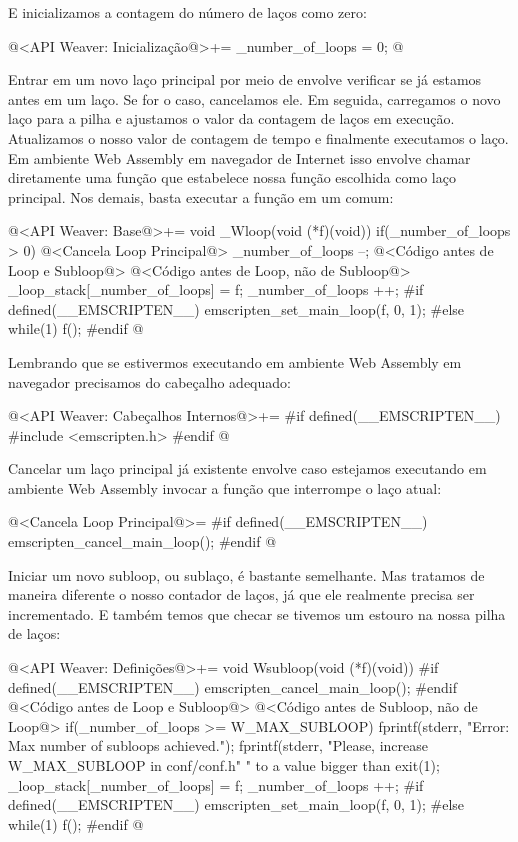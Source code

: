 E inicializamos a contagem do número de laços como zero:

\iniciocodigo
@<API Weaver: Inicialização@>+=
_number_of_loops = 0;
@
\fimcodigo

Entrar em um novo laço principal por meio de 
envolve verificar se já estamos antes em um laço. Se for o caso,
cancelamos ele. Em seguida, carregamos o novo laço para a pilha e
ajustamos o valor da contagem de laços em execução. Atualizamos o
nosso valor de contagem de tempo e finalmente executamos o laço. Em
ambiente Web Assembly em navegador de Internet isso envolve chamar
diretamente uma função que estabelece nossa função escolhida como laço
principal. Nos demais, basta executar a função em
um  comum:

\iniciocodigo
@<API Weaver: Base@>+=
void _Wloop(void (*f)(void)){
  if(_number_of_loops > 0){
    @<Cancela Loop Principal@>
    _number_of_loops --;
  }
  @<Código antes de Loop e Subloop@>
  @<Código antes de Loop, não de Subloop@>
  _loop_stack[_number_of_loops] = f;
  _number_of_loops ++;
#if defined(__EMSCRIPTEN__)
  emscripten_set_main_loop(f, 0, 1);
#else
  while(1)
    f();
#endif
}
@
\fimcodigo

Lembrando que se estivermos executando em ambiente Web Assembly em
navegador precisamos do cabeçalho adequado:

\iniciocodigo
@<API Weaver: Cabeçalhos Internos@>+=
#if defined(__EMSCRIPTEN__)
#include <emscripten.h>
#endif
@
\fimcodigo

Cancelar um laço principal já existente envolve caso estejamos
executando em ambiente Web Assembly invocar a função que interrompe o
laço atual:

\iniciocodigo
@<Cancela Loop Principal@>=
#if defined(__EMSCRIPTEN__)
emscripten_cancel_main_loop();
#endif
@
\fimcodigo

Iniciar um novo subloop, ou sublaço, é bastante semelhante. Mas
tratamos de maneira diferente o nosso contador de laços, já que ele
realmente precisa ser incrementado. E também temos que checar se
tivemos um estouro na nossa pilha de laços:

\iniciocodigo
@<API Weaver: Definições@>+=
void Wsubloop(void (*f)(void)){
#if defined(__EMSCRIPTEN__)
    emscripten_cancel_main_loop();
#endif
  @<Código antes de Loop e Subloop@>
  @<Código antes de Subloop, não de Loop@>
  if(_number_of_loops >= W_MAX_SUBLOOP){
    fprintf(stderr, "Error: Max number of subloops achieved.\n");
    fprintf(stderr, "Please, increase W_MAX_SUBLOOP in conf/conf.h"
            " to a value bigger than %
    exit(1);
  }
  _loop_stack[_number_of_loops] = f;
  _number_of_loops ++;
#if defined(__EMSCRIPTEN__)
  emscripten_set_main_loop(f, 0, 1);
#else
  while(1)
    f();
#endif
}
@
\fimcodigo

